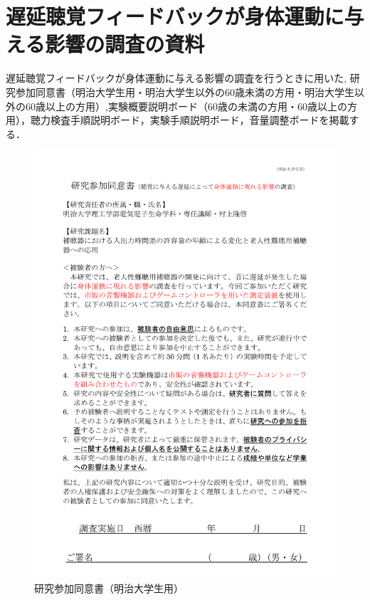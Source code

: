 \chapter{遅延聴覚フィードバックが身体運動に与える影響の調査の資料}
遅延聴覚フィードバックが身体運動に与える影響の調査を行うときに用いた,
研究参加同意書（明治大学生用・明治大学生以外の60歳未満の方用・明治大学生以外の60歳以上の方用）,実験概要説明ボード（60歳の未満の方用・60歳以上の方用），聴力検査手順説明ボード，実験手順説明ボード，音量調整ボードを掲載する．
\begin{figure}[ht]
	\centering
	\includegraphics[scale=0.55]{furoku_A/douisyo_meiji.pdf} %
	\caption{研究参加同意書（明治大学生用）}
\end{figure}
